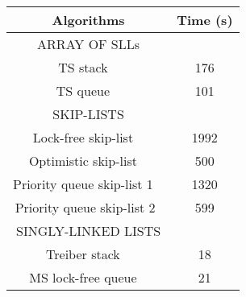 %
%
%
%
%
%



\begin{figure}[]
\center
\footnotesize


\begin{tabular}{|c | c | }
  \hline
   \textsf{{\textbf{Algorithms}}} &  \textsf{{\textbf{Time (s)}}} \\
\hline
\textsf{{{ARRAY OF SLLs}}} & \\
\hline
\textsf{TS stack  ~\cite{ts-stack}}\;\;\;\;\;\;  & \textsf{176} \\
\textsf{TS queue  ~\cite{ts-stack}}& \textsf{101} \\
\hline
 \textsf{{{SKIP-LISTS}}} &   \\
\hline
\;\;\;\;\textsf{Lock-free skip-list   ~\cite{ArtOfMpP}}\;\;\;\;\;\;  & \textsf{1992} \\

\textsf{Optimistic skip-list ~\cite{MS:QueueAlgorithms}}& \textsf{500} \\
 
\textsf{Priority queue skip-list 1 ~\cite{priority-queue-skiplist}}  &  \textsf{1320} \\

\textsf{Priority queue skip-list 2~\cite{Linden:opodis13}}  &  \textsf{599} \\
\hline
   \textsf{{{SINGLY-LINKED LISTS}}} &   \\
\hline
\textsf{Treiber stack  ~\cite{Treiber:stack}}\;\;\;\;\;\; & \textsf {18} \\

\textsf{MS lock-free queue  ~\cite{MS:QueueAlgorithms}}& \textsf{21} \\


\end{tabular}
\end{figure}
